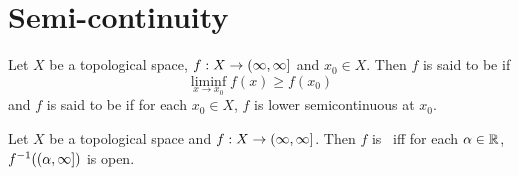 \documentclass{book}
\begin{document}
	
	
	
	
	
	
	
	
	
	





	
	
	
	
	
	
	
	
	
	
	
	
	
	
	
	
	
	
	\newpage
	\section{Semi-continuity}
	
	\begin{defn} \ld{}
	Let $X$ be a topological space, $f: X \rightarrow (\infty, \infty]$ and $x_0 \in X$. Then $f$ is said to be  if $$\liminf_{x \rightarrow x_0}f(x) \geq f(x_0)$$ and $f$ is said to be  if for each $x_0 \in X$, $f$ is lower semicontinuous at $x_0$. 
	\end{defn}
	
	\begin{ex} \lex{}
	Let $X$ be a topological space and $f: X \rightarrow (\infty, \infty]$. Then $f$ is \lsc\ iff for each $\alpha \in \mathbb{R}$, $f^{-1}((\alpha, \infty])$ is open. 
	\end{ex}
	
\end{document}
